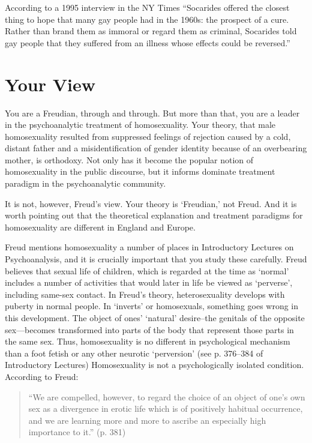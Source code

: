 \begin{refsection}
According to a 1995 interview in the NY Times “Socarides offered the closest thing to hope that many gay people had in the 1960s: the prospect of a cure. Rather than brand them as immoral or regard them as criminal, Socarides told gay people that they suffered from an illness whose effects could be reversed.”

\section{Your View}
\label{yourview}

You are a Freudian, through and through. But more than that, you are a leader in the psychoanalytic treatment of homosexuality. Your theory, that male homosexuality resulted from suppressed feelings of rejection caused by a cold, distant father and a misidentification of gender identity because of an overbearing mother, is orthodoxy. Not only has it become the popular notion of homosexuality in the public discourse, but it informs dominate treatment paradigm in the psychoanalytic community.

It is not, however, Freud's view. Your theory is `Freudian,' not Freud. And it is worth pointing out that the theoretical explanation and treatment paradigms for homosexuality are different in England and Europe.

Freud mentions homosexuality a number of places in Introductory Lectures on Psychoanalysis, and it is crucially important that you study these carefully. Freud believes that sexual life of children, which is regarded at the time as `normal' includes a number of activities that would later in life be viewed as `perverse', including same-sex contact. In Freud's theory, heterosexuality develops with puberty in normal people. In `inverts' or homosexuals, something goes wrong in this development. The object of ones' `natural' desire--the genitals of the opposite sex—becomes transformed into parts of the body that represent those parts in the same sex. Thus, homosexuality is no different in psychological mechanism than a foot fetish or any other neurotic `perversion' (see p. 376--384 of Introductory Lectures) Homosexuality is not a psychologically isolated condition. According to Freud:

\begin{quote}

“We are compelled, however, to regard the choice of an object of one's own sex as a divergence in erotic life which is of positively habitual occurrence, and we are learning more and more to ascribe an especially high importance to it.” (p. 381)
\end{quote}


\end{refsection}
